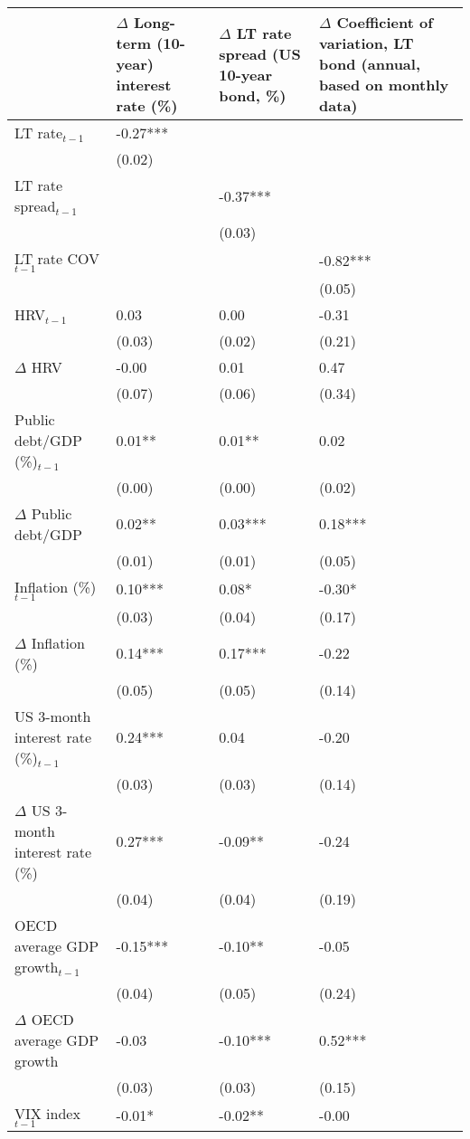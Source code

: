 {\tiny
\begin{tabular}{lp{2cm}p{2cm}p{2cm}}
  \hline
 & $\Delta$ Long-term (10-year) interest rate (\%) & $\Delta$ LT rate spread (US 10-year bond,  \%) & $\Delta$ Coefficient of variation, LT bond (annual, based on monthly data) \\ 
  \hline
LT rate$_{t-1}$ & -0.27*** &  &  \\ 
   & (0.02) &  &  \\ 
  LT rate spread$_{t-1}$ &  & -0.37*** &  \\ 
   &  & (0.03) &  \\ 
  LT rate COV$_{t-1}$ &  &  & -0.82*** \\ 
   &  &  & (0.05) \\ 
  HRV$_{t-1}$ & 0.03 & 0.00 & -0.31 \\ 
   & (0.03) & (0.02) & (0.21) \\ 
  $\Delta$ HRV & -0.00 & 0.01 & 0.47 \\ 
   & (0.07) & (0.06) & (0.34) \\ 
  Public debt/GDP (\%)$_{t-1}$ & 0.01** & 0.01** & 0.02 \\ 
   & (0.00) & (0.00) & (0.02) \\ 
  $\Delta$ Public debt/GDP & 0.02** & 0.03*** & 0.18*** \\ 
   & (0.01) & (0.01) & (0.05) \\ 
  Inflation (\%) $_{t-1}$ & 0.10*** & 0.08* & -0.30* \\ 
   & (0.03) & (0.04) & (0.17) \\ 
  $\Delta$ Inflation (\%) & 0.14*** & 0.17*** & -0.22 \\ 
   & (0.05) & (0.05) & (0.14) \\ 
  US 3-month interest rate (\%)$_{t-1}$ & 0.24*** & 0.04 & -0.20 \\ 
   & (0.03) & (0.03) & (0.14) \\ 
  $\Delta$ US 3-month interest rate (\%) & 0.27*** & -0.09** & -0.24 \\ 
   & (0.04) & (0.04) & (0.19) \\ 
  OECD average GDP growth$_{t-1}$ & -0.15*** & -0.10** & -0.05 \\ 
   & (0.04) & (0.05) & (0.24) \\ 
  $\Delta$ OECD average GDP growth & -0.03 & -0.10*** & 0.52*** \\ 
   & (0.03) & (0.03) & (0.15) \\ 
  VIX index$_{t-1}$ & -0.01* & -0.02** & -0.00 \\ 

\end{tabular}}
